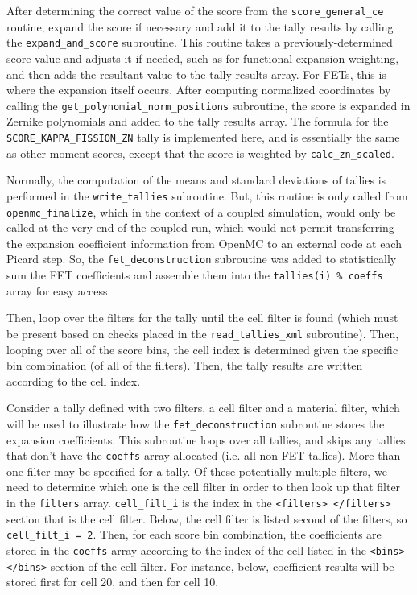 \documentclass[10pt]{article}
\newcounter{subsubsubsection}[subsubsection]
\numberwithin{equation}{section} %
\begin{document}
After determining the correct value of the score from the {\tt score\_general\_ce} routine, expand the score if necessary and add it to the tally results by calling the {\tt expand\_and\_score} subroutine. This routine takes a previously-determined score value and adjusts it if needed, such as for functional expansion weighting, and then adds the resultant value to the tally results array. For FETs, this is where the expansion itself occurs. After computing normalized coordinates by calling the {\tt get\_polynomial\_norm\_positions} subroutine, the score is expanded in Zernike polynomials and added to the tally results array. The formula for the {\tt SCORE\_KAPPA\_FISSION\_ZN} tally is implemented here, and is essentially the same as other moment scores, except that the score is weighted by {\tt calc\_zn\_scaled}. 
			
Normally, the computation of the means and standard deviations of tallies is performed in the {\tt write\_tallies} subroutine. But, this routine is only called from {\tt openmc\_finalize}, which in the context of a coupled simulation, would only be called at the very end of the coupled run, which would not permit transferring the expansion coefficient information from OpenMC to an external code at each Picard step. So, the {\tt fet\_deconstruction} subroutine was added to statistically sum the FET coefficients and assemble them into the {\tt tallies(i) \% coeffs} array for easy access. 

 Then, loop over the filters for the tally until the cell filter is found (which must be present based on checks placed in the {\tt read\_tallies\_xml} subroutine). Then, looping over all of the score bins, the cell index is determined given the specific bin combination (of all of the filters). Then, the tally results are written according to the cell index. 

Consider a tally defined with two filters, a cell filter and a material filter, which will be used to illustrate how the {\tt fet\_deconstruction} subroutine stores the expansion coefficients. This subroutine loops over all tallies, and skips any tallies that don't have the {\tt coeffs} array allocated (i.e. all non-FET tallies). More than one filter may be specified for a tally. Of these potentially multiple filters, we need to determine which one is the cell filter in order to then look up that filter in the {\tt filters} array. {\tt cell\_filt\_i} is the index in the {\tt <filters> </filters>} section that is the cell filter. Below, the cell filter is listed second of the filters, so {\tt cell\_filt\_i = 2}. Then, for each score bin combination, the coefficients are stored in the {\tt coeffs} array according to the index of the cell listed in the {\tt <bins> </bins>} section of the cell filter. For instance, below, coefficient results will be stored first for cell 20, and then for cell 10.
\end{document}
